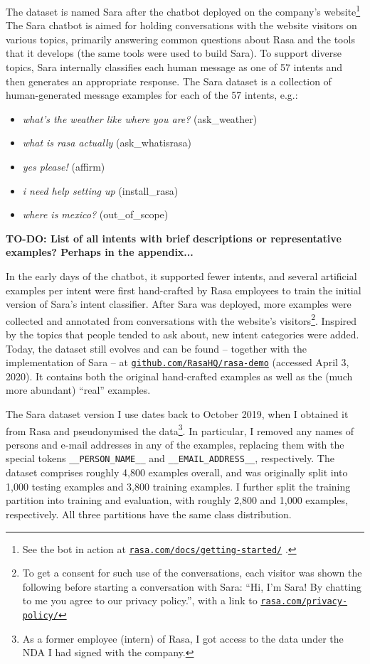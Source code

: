 \documentclass[bsc,frontabs,twoside,singlespacing,parskip,deptreport]{infthesis}
\newcommand\rurl[1]{%
  \href{https://#1}{\nolinkurl{#1}}%
}
\begin{document}
{{{      The dataset is named Sara after the chatbot deployed on the company's website\footnote{See the bot in action at \rurl{rasa.com/docs/getting-started/}.}
      The Sara chatbot is aimed for holding conversations with the website visitors on various topics, primarily answering common questions about Rasa and the tools that it develops (the same tools were used to build Sara).
      To support diverse topics, Sara internally classifies each human message as one of 57 intents and then generates an appropriate response. The Sara dataset is a collection of human-generated message examples for each of the 57 intents, e.g.:
      \begin{itemize}
        \item \textit{what's the weather like where you are?} (ask\_weather)
        \item \textit{what is rasa actually} (ask\_whatisrasa)
        \item \textit{yes please!} (affirm)
        \item \textit{i need help setting up} (install\_rasa)
        \item \textit{where is mexico?} (out\_of\_scope)
      \end{itemize}
      \textbf{TO-DO: List of all intents with brief descriptions or representative examples? Perhaps in the appendix...}

      In the early days of the chatbot, it supported fewer intents, and several artificial examples per intent were first hand-crafted by Rasa employees to train the initial version of Sara's intent classifier. After Sara was deployed, more examples were collected and annotated from conversations with the website's visitors\footnote{To get a consent for such use of the conversations, each visitor was shown the following before starting a conversation with Sara: ``Hi, I'm Sara! By chatting to me you agree to our privacy policy.'', with a link to \rurl{rasa.com/privacy-policy/}}. Inspired by the topics that people tended to ask about, new intent categories were added. Today, the dataset still evolves and can be found -- together with the implementation of Sara -- at \rurl{github.com/RasaHQ/rasa-demo} (accessed April 3, 2020). It contains both the original hand-crafted examples as well as the (much more abundant) ``real'' examples.

      The Sara dataset version I use dates back to October 2019, when I obtained it from Rasa and pseudonymised the data\footnote{As a former employee (intern) of Rasa, I got access to the data under the NDA I had signed with the company.}. In particular, I removed any names of persons and e-mail addresses in any of the examples, replacing them with the special tokens \verb|__PERSON_NAME__| and \verb|__EMAIL_ADDRESS__|, respectively.      
      The dataset comprises roughly 4,800 examples overall, and was originally split into 1,000 testing examples and 3,800 training examples. 
      I further split the training partition into training and evaluation, with roughly 2,800 and 1,000 examples, respectively. All three partitions have the same class distribution.

}}}
\end{document}
